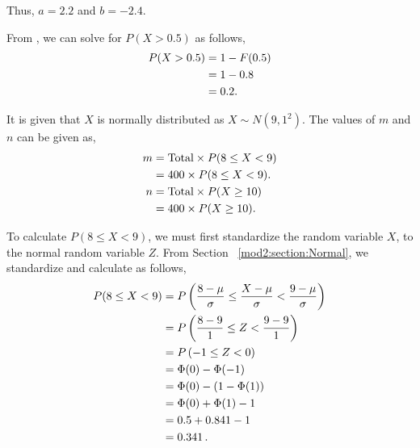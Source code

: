 \begin{subquestions}
\begin{subsubquestions}
Thus, $a=2.2$ and $b=-2.4$.


\subsubquestion

From ,  we can solve for $P(X>0.5)$ as follows,
\begin{align}
	P(X>0.5) & = 1 - F(0.5) \nonumber \\
	         & = 1 - 0.8 \nonumber \\
	         & = 0.2.
\end{align}

\end{subsubquestions}


\subquestion

\begin{subsubquestions}
	
\subsubquestion

It is given that $X$ is normally distributed as $X \sim N(9,1^2)$. The values of $m$ and $n$ can be given as,
\begin{align}
	m & = \text{Total} \times P(8 \leq X < 9) \nonumber \\
	  & = 400 \times P(8 \leq X < 9). \\
    n & = \text{Total} \times P(X \geq 10) \nonumber \\
      & = 400 \times P(X \geq 10). \label{2015:q4:MNeqn}
\end{align}
	
To calculate $P(8 \leq X < 9)$, we must first standardize the random variable $X$, to the normal random variable $Z$. From Section ~\ref{mod2:section:Normal}, we standardize and calculate as follows,
\begin{align}
	P(8 \leq X < 9) & = P\left(\frac{8- \mu}{\sigma} \leq \frac{X-\mu}{\sigma} < \frac{9-\mu}{\sigma} \right) \nonumber \\
	                & = P\left(\frac{8- 9}{1} \leq Z < \frac{9-9}{1} \right) \nonumber \\
	                & = P\left(-1 \leq Z < 0 \right) \nonumber \\
	                & = \Phi(0) - \Phi(-1) \nonumber \\
	                & = \Phi(0) - (1 - \Phi(1)) \nonumber \\
	                & = \Phi(0) + \Phi(1) - 1 \nonumber \\
	                & = 0.5 + 0.841 - 1 \nonumber \\
	                & = 0.341 \,. \label{2015:q4:Normal1}
\end{align}


\end{subsubquestions}
\end{subquestions}
